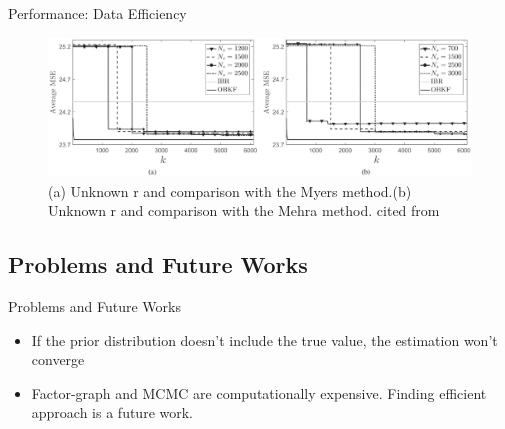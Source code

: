\begin{frame}{Performance: Data Efficiency}
    
\begin{figure}[H]
    \begin{center}
    \includegraphics[width=12cm]{img/cmp_adaptive.eps}
    \caption{(a) Unknown r and comparison with the Myers method.\protect\linebreak (b) Unknown r and comparison with the Mehra method. cited from \cite{Dehghannasiri2018}}
    \label{fig:cmp_adaptive}
    \end{center}
\end{figure}

\end{frame}


\subsection{Problems and Future Works}
\begin{frame}{Problems and Future Works}
\begin{itemize}
    \item If the prior distribution doesn't include the true value, the estimation won't converge
    \item Factor-graph and MCMC are computationally expensive. Finding efficient approach is a future work.
\end{itemize}
\end{frame}